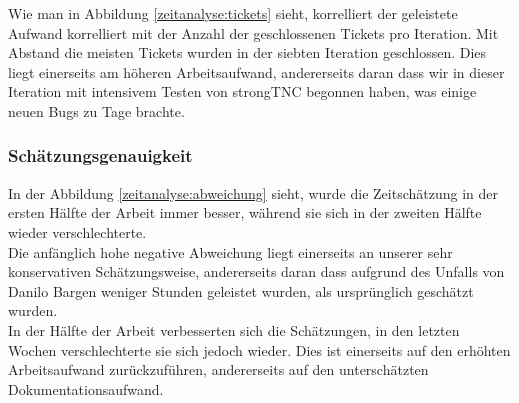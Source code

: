 Wie man in Abbildung \ref{zeitanalyse:tickets} sieht, korrelliert der geleistete
Aufwand korrelliert mit der Anzahl der geschlossenen Tickets pro Iteration. Mit
Abstand die meisten Tickets wurden in der siebten Iteration geschlossen. Dies
liegt einerseits am höheren Arbeitsaufwand, andererseits daran dass wir in
dieser Iteration mit intensivem Testen von strongTNC begonnen haben, was einige
neuen Bugs zu Tage brachte.

\subsubsection{Schätzungsgenauigkeit}

In der Abbildung \ref{zeitanalyse:abweichung} sieht, wurde die Zeitschätzung in
der ersten Hälfte der Arbeit immer besser, während sie sich in der zweiten Hälfte
wieder verschlechterte. \\
Die anfänglich hohe negative Abweichung liegt einerseits an unserer sehr
konservativen Schätzungsweise, andererseits daran dass aufgrund des Unfalls von
Danilo Bargen weniger Stunden geleistet wurden, als ursprünglich geschätzt
wurden. \\
In der Hälfte der Arbeit verbesserten sich die Schätzungen, in den letzten
Wochen verschlechterte sie sich jedoch wieder. Dies ist einerseits auf den
erhöhten Arbeitsaufwand zurückzuführen, andererseits auf den unterschätzten
Dokumentationsaufwand.

